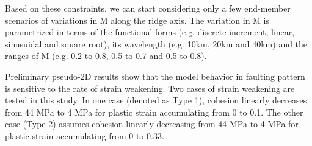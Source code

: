 Based on these constraints, we can start considering only a few end-member scenarios of variations in M along the ridge axis. The variation in M is parametrized in terms of the functional forms (e.g. discrete increment, linear, sinusuidal and square root), its wavelength (e.g. 10km, 20km and 40km) and the ranges of M (e.g. 0.2 to 0.8, 0.5 to 0.7 and 0.5 to 0.8). 

Preliminary pseudo-2D results show that the model behavior in faulting pattern is sensitive to the rate of strain weakening. Two cases of strain weakening are tested in this study. In one case (denoted as Type 1), cohesion linearly decreases from 44 MPa to 4 MPa for plastic strain accumulating from 0 to 0.1. The other case (Type 2) assumes cohesion linearly decreasing from 44 MPa to 4 MPa for plastic strain accumulating from 0 to 0.33.
